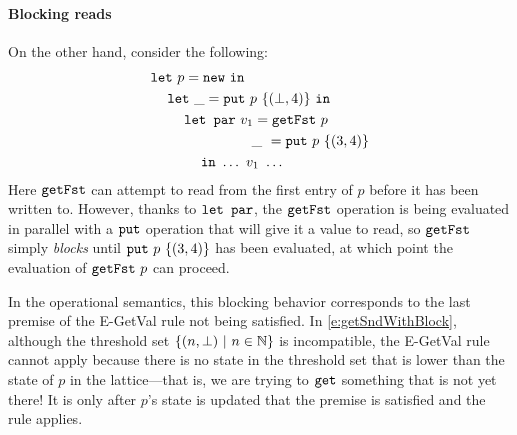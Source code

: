 \paragraph{Blocking reads}

On the other hand, consider the following:
\begin{equation}
\begin{split}
& \letexp{p}{\NEW}{ \\
& \letspace \letexp{\_}{\putexp{p}{\stateset{(\bot,4)}}}{ \\
& \letspace \letspace \LETPAR ~v_1 = \getfstexp{p} \\
& \letspace \letspace \letparspace \hspace{0.62em}\_~= \putexp{p}{\stateset{(3,4)}} \\
& \letspace \letspace \letspace \IN~ \dots~v_1~\dots }}
\end{split}
\label{e:getSndWithBlock}
\end{equation}
Here $\mbox{\texttt{getFst}}$ can attempt to read from the first entry of $p$ before
it has been written to.  However, thanks to $\mbox{\texttt{\mbox{\texttt{let}}~\mbox{\texttt{par}}}}$, the $\mbox{\texttt{getFst}}$
operation is being evaluated in parallel with a $\mbox{\texttt{put}}$ operation that
will give it a value to read, so $\mbox{\texttt{getFst}}$ simply \emph{blocks} until
$\mbox{\texttt{put}}~p~\lbrace (3,4) \rbrace$ has been evaluated, at which point the
evaluation of $\mbox{\texttt{getFst}}~p$ can proceed.

In the operational semantics, this blocking behavior corresponds to
the last premise of the {\sc E-GetVal} rule not being satisfied.  In
\eqref{e:getSndWithBlock}, although the threshold set $\lbrace (n,
  \bot) \ | \  n \in \mathbb{N} \rbrace$ is incompatible, the {\sc E-GetVal}
rule cannot apply because there is no state in the threshold set that
is lower than the state of $p$ in the lattice---that is, we are trying
to $\mbox{\texttt{get}}$ something that is not yet there!  It is only after $p$'s
state is updated that the premise is satisfied and the rule applies.
